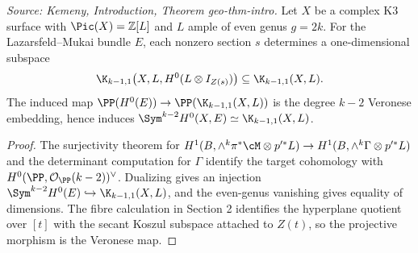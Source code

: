\begin{theorem}
  \label{thm:kemeny_even_geometric_syzygy_structure}
  \textit{Source: Kemeny, Introduction, Theorem geo-thm-intro.}
  Let \(X\) be a complex K3 surface with \(\Pic(X)=\mathbb Z[L]\) and \(L\)
  ample of even genus \(g=2k\).  For the Lazarsfeld--Mukai bundle \(E\), each
  nonzero section \(s\) determines a one-dimensional subspace
  \[
    \K_{k-1,1}\bigl(X,L,H^0(L\otimes I_{Z(s)})\bigr)\subseteq \K_{k-1,1}(X,L).
  \]
  The induced map
  \(\PP(H^0(E))\to \PP(\K_{k-1,1}(X,L))\) is the degree \(k-2\) Veronese
  embedding, hence induces
  \(\Sym^{k-2}H^0(X,E)\simeq \K_{k-1,1}(X,L)\).
\end{theorem}
\begin{proof}
  The surjectivity theorem for
  \(H^1(B,\wedge^k\pi^*\cM\otimes p'^*L)\to H^1(B,\wedge^k\Gamma\otimes p'^*L)\)
  and the determinant computation for \(\Gamma\) identify the target cohomology
  with \(H^0(\PP,\mathcal O_{\PP}(k-2))^\vee\).  Dualizing gives an injection
  \(\Sym^{k-2}H^0(E)\hookrightarrow \K_{k-1,1}(X,L)\), and the even-genus
  vanishing gives equality of dimensions.  The fibre calculation in Section 2
  identifies the hyperplane quotient over \([t]\) with the secant Koszul
  subspace attached to \(Z(t)\), so the projective morphism is the Veronese map.
\end{proof}

